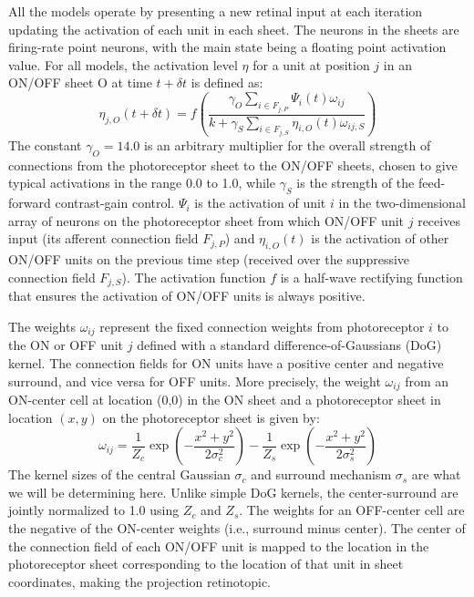 All the models operate by presenting a new retinal input at each
iteration updating the activation of each unit in each sheet. The
neurons in the sheets are firing-rate point neurons, with the main
state being a floating point activation value.  For all models, the
activation level $\eta$ for a unit at position $j$ in an ON/OFF sheet
O at time $t+\delta t$ is defined as:
\begin{equation}
\eta_{j, O}(t+\delta t)=f\left(\frac{\gamma_{O}\sum_{i\in
    F_{j,P}}\Psi_{i}(t)\omega_{ij}}{k+\gamma_{S}\sum_{i\in
    F_{j,S}}\eta_{i, O}(t)\omega_{ij, S}}\right)
\label{eqn:lgnactivation}
\end{equation}
The constant $\gamma_{O}=14.0$ is an arbitrary multiplier for the
overall strength of connections from the photoreceptor sheet to the
ON/OFF sheets, chosen to give typical activations in the range 0.0 to
1.0, while $\gamma_{S}$ is the strength of the feed-forward
contrast-gain control. $\Psi_{i}$ is the activation of unit $i$ in the
two-dimensional array of neurons on the photoreceptor sheet from which
ON/OFF unit $j$ receives input (its afferent connection field
$F_{j,P}$) and $\eta_{i, O}(t)$ is the activation of other ON/OFF
units on the previous time step (received over the suppressive
connection field $F_{j,S}$). The activation function $f$ is a
half-wave rectifying function that ensures the activation of ON/OFF
units is always positive.

The weights $\omega_{ij}$ represent the fixed connection weights from
photoreceptor $i$ to the ON or OFF unit $j$ defined with a standard
difference-of-Gaussians (DoG) kernel. The connection fields for ON units
have a positive center and negative surround, and vice versa for OFF
units. More precisely, the weight $\omega_{ij}$ from an ON-center cell
at location (0,0) in the ON sheet and a photoreceptor sheet in
location $(x,y)$ on the photoreceptor sheet is given by:
\begin{equation}
\omega_{ij}=\frac{1}{Z_c}\exp{\left(-\frac{x^{2}+y^{2}}{2\sigma_{c}^{2}}\right)}-\frac{1}{Z_s}\exp\left(-\frac{x^{2}+y^{2}}{2\sigma_{s}^{2}}\right)
\label{eqn:DoG}
\end{equation}
The kernel sizes of the central Gaussian $\sigma_{c}$ and surround
mechanism $\sigma_{s}$ are what we will be determining here. Unlike
simple DoG kernels, the center-surround are jointly normalized to 1.0
using $Z_c$ and $Z_s$. The weights for an OFF-center cell are the
negative of the ON-center weights (i.e., surround minus center). The
center of the connection field of each ON/OFF unit is mapped to the
location in the photoreceptor sheet corresponding to the location of
that unit in sheet coordinates, making the projection retinotopic.

